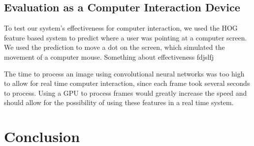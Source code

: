 \documentclass[10pt,twocolumn,letterpaper]{article}
\begin{document}
\subsection{Evaluation as a Computer Interaction Device}
	
To test our system's effectiveness for computer interaction, we used the HOG feature based system to predict where a user was pointing at a computer screen.  We used the prediction to move a dot on the screen, which simulated the movement of a computer mouse.  Something about effectiveness fdjslfj

The time to process an image using convolutional neural networks was too high to allow for real time computer interaction, since each frame took several seconds to process.  Using a GPU to process frames would greatly increase the speed and should allow for the possibility of using these features in a real time system.

\section{Conclusion}


{\small


}
\end{document}
